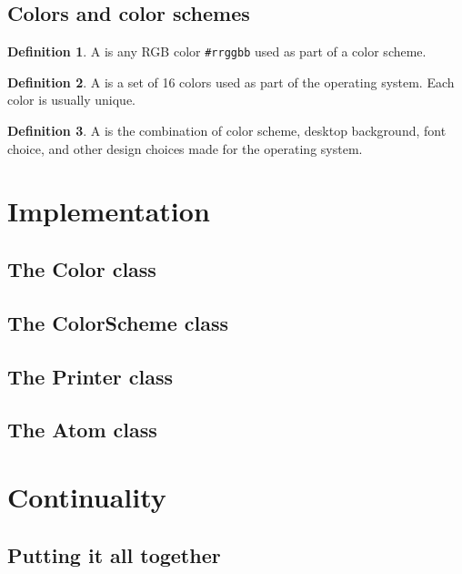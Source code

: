 \documentclass{article}
\theoremstyle{definition}
\newtheorem{definition}{Definition}
\begin{document}
    \subsection{Colors and color schemes}

    \begin{definition}
        A  is any RGB color \texttt{\#rrggbb} used as part of a color scheme.
    \end{definition}

    \begin{definition}
        A  is a set of 16 colors used as part of the operating system. Each color is usually unique.
    \end{definition}

    \begin{definition}
        A  is the combination of color scheme, desktop background, font choice, and other design choices made for the operating system.
    \end{definition}

    \newpage


    \section{Implementation}

    \subsection{The \textbf{Color} class}

    \subsection{The \textbf{ColorScheme} class}

    \subsection{The \textbf{Printer} class}

    \subsection{The \textbf{Atom} class}

    \newpage

    \section{Continuality}

    \subsection{Putting it all together}
\end{document}
